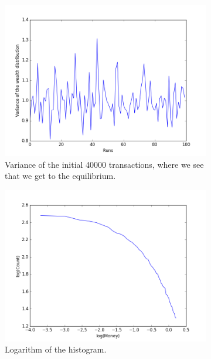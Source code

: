\documentclass[a4paper,11pt]{article}
\begin{document}
{\begin{figure}[H]
	\centering
	\begin{subfigure}[b]{0.27\textwidth}
		\includegraphics[scale=0.27]{propersimpleinit}
		\caption{Variance of the initial 40000 transactions, where we see that we get to the equilibrium. }
		\label{fig:propersimpleinit}
	\end{subfigure}
	\begin{subfigure}[b]{0.27\textwidth}
		\includegraphics[scale=0.27]{Proper_simple_transaction_log}
		\caption{Logarithm of the histogram. }
		\label{fig:Proper_simple_transaction_log}
	\end{subfigure}
	\begin{subfigure}[b]{0.27\textwidth}

\end{subfigure}
\end{figure}}
\end{document}
